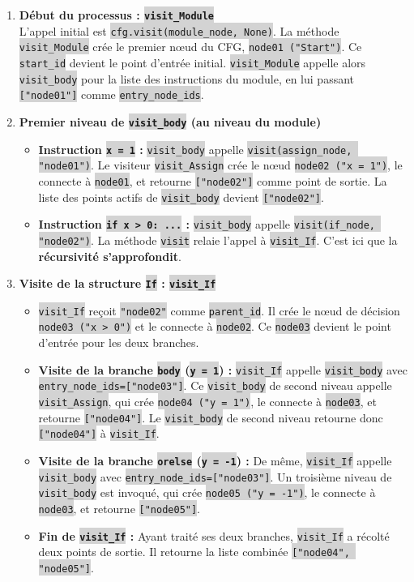 \documentclass[11pt,a4paper]{article}
\newcommand{\code}[1]{\colorbox{lightgray}{\texttt{\small #1}}}
\begin{document}
\begin{enumerate}

    \item \textbf{Début du processus : \code{visit\_Module}} \\L'appel initial est \code{cfg.visit(module\_node, None)}. La méthode \code{visit\_Module} crée le premier nœud du CFG, \code{node01 ("Start")}. Ce \code{start\_id} devient le point d'entrée initial. \code{visit\_Module} appelle alors \code{visit\_body} pour la liste des instructions du module, en lui passant \code{["node01"]} comme \code{entry\_node\_ids}.
    \item \textbf{Premier niveau de \code{visit\_body} (au niveau du module)}
    \begin{itemize}
        \item \textbf{Instruction \code{x = 1} :} \code{visit\_body} appelle \code{visit(assign\_node, "node01")}. Le visiteur \code{visit\_Assign} crée le nœud \code{node02 ("x = 1")}, le connecte à \code{node01}, et retourne \code{["node02"]} comme point de sortie. La liste des points actifs de \code{visit\_body} devient \code{["node02"]}.
        \item \textbf{Instruction \code{if x > 0: ...} :} \code{visit\_body} appelle \code{visit(if\_node, "node02")}. La méthode \code{visit} relaie l'appel à \code{visit\_If}. C'est ici que la \textbf{récursivité s'approfondit}.
    \end{itemize}

    \item \textbf{Visite de la structure \code{If} : \code{visit\_If}}
    \begin{itemize}
        \item \code{visit\_If} reçoit \code{"node02"} comme \code{parent\_id}. Il crée le nœud de décision \code{node03 ("x > 0")} et le connecte à \code{node02}. Ce \code{node03} devient le point d'entrée pour les deux branches.
        \item \textbf{Visite de la branche \code{body} (\code{y = 1}) :} \code{visit\_If} appelle \code{visit\_body} avec \code{entry\_node\_ids=["node03"]}. Ce \code{visit\_body} de second niveau appelle \code{visit\_Assign}, qui crée \code{node04 ("y = 1")}, le connecte à \code{node03}, et retourne \code{["node04"]}. Le \code{visit\_body} de second niveau retourne donc \code{["node04"]} à \code{visit\_If}.
        \item \textbf{Visite de la branche \code{orelse} (\code{y = -1}) :} De même, \code{visit\_If} appelle \code{visit\_body} avec \code{entry\_node\_ids=["node03"]}. Un troisième niveau de \code{visit\_body} est invoqué, qui crée \code{node05 ("y = -1")}, le connecte à \code{node03}, et retourne \code{["node05"]}.
        \item \textbf{Fin de \code{visit\_If} :} Ayant traité ses deux branches, \code{visit\_If} a récolté deux points de sortie. Il retourne la liste combinée \code{["node04", "node05"]}.
    \end{itemize}


\end{enumerate}
\end{document}
